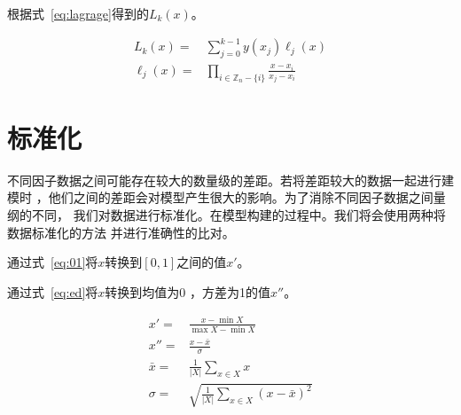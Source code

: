 \documentclass[../main]{subfiles}
\begin{document}
\begin{definition}[拉格朗日插值法]%
  \label{def:lagrage}
  根据式~\ref{eq:lagrage}得到的$L_k(x)$。
\end{definition}

\begin{align}
  \label{eq:lagrage}
  L_k(x) = & \sum_{j = 0}^{k - 1} y(x_j) \ell_j(x)\\
  \ell_j(x) = & \prod_{i\in \mathbb{Z}_n - \{i\}}\frac{x-x_i}{x_j-x_i}
\end{align}

\section{标准化}%
\label{sec:standard}

不同因子数据之间可能存在较大的数量级的差距。若将差距较大的数据一起进行建模时
，他们之间的差距会对模型产生很大的影响。为了消除不同因子数据之间量纲的不同，
我们对数据进行标准化。在模型构建的过程中。我们将会使用两种将数据标准化的方法
并进行准确性的比对。

\begin{definition}[0--1标准化]
  通过式~\ref{eq:01}将$x$转换到$[0, 1]$之间的值$x'$。
\end{definition}

\begin{definition}[均值方差标准化]
  通过式~\ref{eq:ed}将$x$转换到均值为0 ，方差为1的值$x''$。
\end{definition}

\begin{align}
  \label{eq:01}
  x' = & \frac{x-\min{X}}{\max{X} - \min{X}}\\
  \label{eq:ed}
  x'' = & \frac{x - \bar{x}}{\sigma}\\
  \bar{x} = & \frac{1}{\lvert X\rvert}\sum_{x \in X} x\\
  \sigma = & \sqrt{\frac{1}{\lvert X\rvert}\sum_{x \in X}{(x - \bar{x})}^2}
\end{align}
\end{document}
